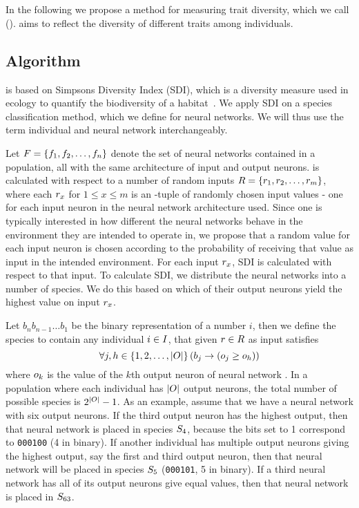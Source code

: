 \section{\di{}}\label{sec:nntd}
In the following we propose a method for measuring trait diversity, which we call \emph{\di{}} (\dia). \dia{} aims to reflect the diversity of different traits among individuals. 

\subsection{Algorithm}
\dia{} is based on Simpsons Diversity Index (SDI), which is a diversity measure used in ecology to quantify the biodiversity of a habitat~\cite{simpson1949measurement}. We apply SDI on a species classification method, which we define for neural networks. We will thus use the term individual and neural network interchangeably.

Let $F = \left\{ f_1, f_2, \dots, f_n \right\}$ denote the set of neural networks contained in a population, all with the same architecture of \nninsetl{} input and \nnoutsetl{} output neurons. \dia{} is calculated with respect to a number of random inputs $R = \left\{ r_1, r_2, \dots, r_m \right\}$, where each $r_x$ for $1 \leq x \leq m$ is an \nninsetl-tuple of randomly chosen input values - one for each input neuron in the neural network architecture used.
Since one is typically interested in how different the neural networks behave in the environment they are intended to operate in, we propose that a random value for each input neuron is chosen according to the probability of receiving that value as input in the intended environment. For each input $r_x$, SDI is calculated with respect to that input.
To calculate SDI, we distribute the neural networks into a number of species.
We do this based on which of their output neurons yield the highest value on input $r_x$. 

Let $b_{n}b_{n-1}\dots b_1$ be the binary representation of a number $i$,
then we define the species  to contain any individual $i \in I$, that given $r \in R$ as input satisfies
%
\begin{equation}\label{eq:nntdbucket}
  \forall j, h \in \left\{ 1, 2, \dots, \lvert O\rvert \right\} \left(b_j \rightarrow \left(o_j \geq o_h\right)\right)
\end{equation}
%
where $o_k$ is the value of the $k$th output neuron of neural network \ind.
In a population where each individual has $\lvert O\rvert$ output neurons, the total number of possible species is $2^{\lvert O\rvert} - 1$.  As an example, assume that we have a neural network with six output neurons. If the third output neuron has the highest output, then that neural network is placed in species $S_4$, because the bits set to 1 correspond to \texttt{000100} (4 in binary). If another individual has multiple output neurons giving the highest output, say the first and third output neuron, then that neural network will be placed in species $S_5$ (\texttt{000101}, 5 in binary). If a third neural network has all of its output neurons give equal values, then that neural network is placed in $S_{63}$.

